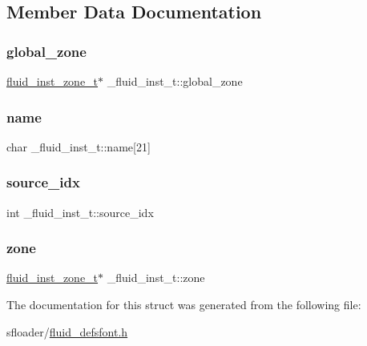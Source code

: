 \subsection{Member Data Documentation}
\mbox{\label{struct__fluid__inst__t_a3ba1374703f8f5f269ee9915e8155d1f}} 
\subsubsection{\texorpdfstring{global\+\_\+zone}{global\_zone}}
{\footnotesize\ttfamily \hyperlink{fluid__defsfont_8h_aa02ac18b4c58545cc3b297bdf4d933ab}{fluid\+\_\+inst\+\_\+zone\+\_\+t}$\ast$ \+\_\+fluid\+\_\+inst\+\_\+t\+::global\+\_\+zone}

\mbox{\label{struct__fluid__inst__t_ab23fbac1313132d2875e9a140f891360}} 
\subsubsection{\texorpdfstring{name}{name}}
{\footnotesize\ttfamily char \+\_\+fluid\+\_\+inst\+\_\+t\+::name\mbox{[}21\mbox{]}}

\mbox{\label{struct__fluid__inst__t_afce8fb8979a1c3d4848042a3f1fbf57e}} 
\subsubsection{\texorpdfstring{source\+\_\+idx}{source\_idx}}
{\footnotesize\ttfamily int \+\_\+fluid\+\_\+inst\+\_\+t\+::source\+\_\+idx}

\mbox{\label{struct__fluid__inst__t_a3ee3921ad01c3cdd87b35e32ba9fea4e}} 
\subsubsection{\texorpdfstring{zone}{zone}}
{\footnotesize\ttfamily \hyperlink{fluid__defsfont_8h_aa02ac18b4c58545cc3b297bdf4d933ab}{fluid\+\_\+inst\+\_\+zone\+\_\+t}$\ast$ \+\_\+fluid\+\_\+inst\+\_\+t\+::zone}



The documentation for this struct was generated from the following file\+:\begin{DoxyCompactItemize}
\item 
sfloader/\hyperlink{fluid__defsfont_8h}{fluid\+\_\+defsfont.\+h}\end{DoxyCompactItemize}
